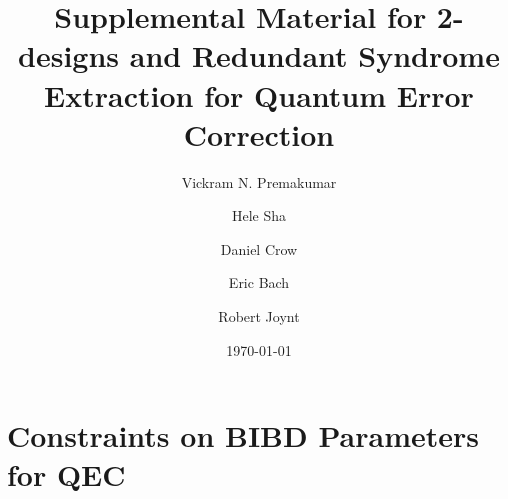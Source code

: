 \documentclass[superscriptaddress, notitlepage]{revtex4-1}
\begin{document}
\title{Supplemental Material for 2-designs and Redundant Syndrome Extraction for Quantum Error Correction }
\author{Vickram N. Premakumar}
\address{Physics Department, University of Wisconsin-Madison, 1150 Univ. Ave., Madison, WI, USA}
\author{Hele Sha}
\address{Physics Department, University of Wisconsin-Madison, 1150 Univ. Ave., Madison, WI, USA}
\author{Daniel Crow}
\address{Physics Department, University of Wisconsin-Madison, 1150 Univ. Ave., Madison, WI, USA}
\author{Eric Bach}
\address{Computer Science Department, University of Wisconsin-Madison, Madison, WI, USA}
\author{Robert Joynt}
\address{Physics Department, University of Wisconsin-Madison, 1150 Univ. Ave., Madison, WI, USA}
\address{
	Kavli Institute for Theoretical Sciences, University of Chinese Academy of Sciences, Beijing 100190, China}
\date{{\normalsize \today}}

\maketitle

\section{Constraints on BIBD Parameters for QEC}
\end{document}
